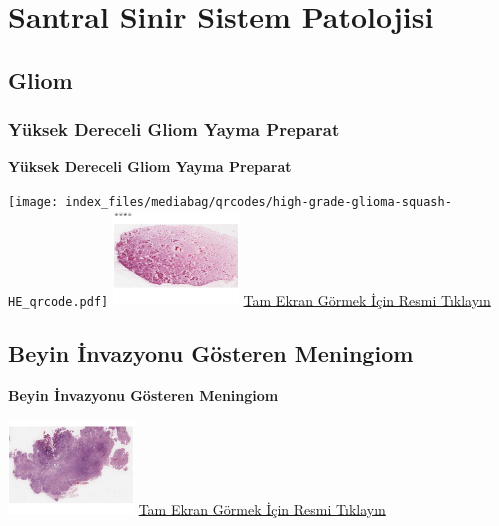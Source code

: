 \documentclass[
  letterpaper,
  DIV=11,
  numbers=noendperiod]{scrreprt}
\begin{document}
\part{Santral Sinir Sistem Patolojisi}

\hypertarget{sec-gliom}{%
\chapter{Gliom}\label{sec-gliom}}

\hypertarget{sec-yuksek-dereceli-gliom-yayma-preparat}{%
\section{Yüksek Dereceli Gliom Yayma
Preparat}\label{sec-yuksek-dereceli-gliom-yayma-preparat}}

\textbf{Yüksek Dereceli Gliom Yayma Preparat}

\texttt{[image: index\_files/mediabag/qrcodes/high-grade-glioma-squash-HE\_qrcode.pdf]}
\href{https://images.patolojiatlasi.com/high-grade-glioma-squash/HE.html}{\includegraphics[width=0.25\textwidth,height=\textheight]{./screenshots/thumbnail_high-grade-glioma-squash.png}}
\href{https://images.patolojiatlasi.com/high-grade-glioma-squash/HE.html}{Tam
Ekran Görmek İçin Resmi Tıklayın}

\hypertarget{sec-beyin-invazyonu-gosteren-meningiom}{%
\chapter{Beyin İnvazyonu Gösteren
Meningiom}\label{sec-beyin-invazyonu-gosteren-meningiom}}

\textbf{Beyin İnvazyonu Gösteren Meningiom}

\href{https://images.patolojiatlasi.com/brain-invasive-meningioma/HE.html}{\includegraphics[width=0.25\textwidth,height=\textheight]{./screenshots/thumbnail_brain-invasive-meningioma.png}}
\href{https://images.patolojiatlasi.com/brain-invasive-meningioma/HE.html}{Tam
Ekran Görmek İçin Resmi Tıklayın}
\end{document}
